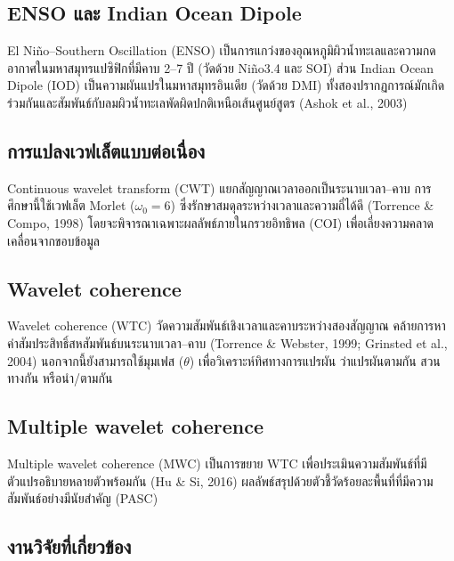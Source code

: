 \documentclass[a4paper,11pt]{article}
\begin{document}
\subsection{ENSO และ Indian Ocean Dipole}

El Niño–Southern Oscillation (ENSO) เป็นการแกว่งของอุณหภูมิผิวน้ำทะเลและความกดอากาศในมหาสมุทรแปซิฟิกที่มีคาบ 2–7 ปี
(วัดด้วย Niño3.4 และ SOI) ส่วน Indian Ocean Dipole (IOD) เป็นความผันแปรในมหาสมุทรอินเดีย (วัดด้วย DMI)
ทั้งสองปรากฏการณ์มักเกิดร่วมกันและสัมพันธ์กับลมผิวน้ำทะเลพัดผิดปกติเหนือเส้นศูนย์สูตร (Ashok et al., 2003)

\subsection{การแปลงเวฟเล็ตแบบต่อเนื่อง}

Continuous wavelet transform (CWT) แยกสัญญาณเวลาออกเป็นระนาบเวลา–คาบ การศึกษานี้ใช้เวฟเล็ต Morlet ($\omega_0 = 6$)
ซึ่งรักษาสมดุลระหว่างเวลาและความถี่ได้ดี (Torrence \& Compo, 1998) โดยจะพิจารณาเฉพาะผลลัพธ์ภายในกรวยอิทธิพล (COI)
เพื่อเลี่ยงความคลาดเคลื่อนจากขอบข้อมูล

\subsection{Wavelet coherence}

Wavelet coherence (WTC) วัดความสัมพันธ์เชิงเวลาและคาบระหว่างสองสัญญาณ คล้ายการหาค่าสัมประสิทธิ์สหสัมพันธ์บนระนาบเวลา–คาบ
(Torrence \& Webster, 1999; Grinsted et al., 2004) นอกจากนี้ยังสามารถใช้มุมเฟส ($\theta$) เพื่อวิเคราะห์ทิศทางการแปรผัน
ว่าแปรผันตามกัน สวนทางกัน หรือนำ/ตามกัน

\subsection{Multiple wavelet coherence}

Multiple wavelet coherence (MWC) เป็นการขยาย WTC เพื่อประเมินความสัมพันธ์ที่มีตัวแปรอธิบายหลายตัวพร้อมกัน (Hu \& Si, 2016)
ผลลัพธ์สรุปด้วยตัวชี้วัดร้อยละพื้นที่ที่มีความสัมพันธ์อย่างมีนัยสำคัญ (PASC)

\subsection{งานวิจัยที่เกี่ยวข้อง}
\end{document}
